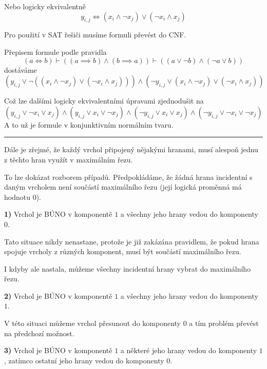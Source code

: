 \documentclass{article}
\begin{document}
Nebo logicky ekvivalentně
\[ \boxed{ y_{i,j} \iff (x_i \land \neg x_j) \vee ( \neg x_i \land x_j) } \]

\vspace{5mm}
\vspace{5mm}
Pro použití v SAT řešiči musíme formuli převést do CNF.

\vspace{5mm}
Přepisem formule podle pravidla
\[(a \iff b) \vdash ( (a \implies b) \wedge (b \implies a) ) \vdash ( (a \vee \neg b) \wedge (\neg a \vee b) )\]
dostáváme
\[
( y_{i,j} \vee \neg ((x_i \land \neg x_j) \vee ( \neg x_i \land x_j)) )
\wedge
( \neg y_{i,j} \vee (x_i \land \neg x_j) \vee ( \neg x_i \land x_j) )
\]

\vspace{5mm}
Což lze dalšími logicky ekvivalentními úpravami zjednodušit na 
\[ \boxed{
( y_{i,j} \vee \neg x_i \vee x_j ) \wedge
( y_{i,j} \vee x_i \vee \neg x_j ) \wedge
( \neg y_{i,j} \vee x_i \vee x_j ) \wedge
( \neg y_{i,j} \vee \neg x_i \vee \neg x_j )
} \]
A to už je formule v konjunktivním normálním tvaru.

\vspace{5mm}
\hrule\vspace{5mm}

Dále je zřejmé, že každý vrchol připojený nějakými hranami, musí alespoň jednu z těchto hran využít v maximálním řezu.

To lze dokázat rozborem případů. Předpokládáme, že žádná hrana incidentní s daným vrcholem není součástí maximálního řezu (její logická proměnná má hodnotu $0$).

\vspace{5mm}
\textbf {1)}
Vrchol je BÚNO v komponentě $1$ a všechny jeho hrany vedou do komponenty $0$.

Tato situace nikdy nenastane, protože je již zakázána pravidlem, že pokud hrana spojuje vrcholy z různých komponent, musí být součástí maximálního řezu.

I kdyby ale nastala, můžeme všechny incidentní hrany vybrat do maximálního řezu.

\vspace{5mm}
\textbf {2)}
Vrchol je BÚNO v komponentě $1$ a všechny jeho hrany vedou do komponenty $1$.

V této situaci můžeme vrchol přesunout do komponenty $0$ a tím problém převést na předchozí možnost.

\vspace{5mm}
\textbf {3)}
Vrchol je BÚNO v komponentě $1$ a některé jeho hrany vedou do komponenty $1$, zatímco ostatní jeho hrany vedou do komponenty $0$.
\end{document}
